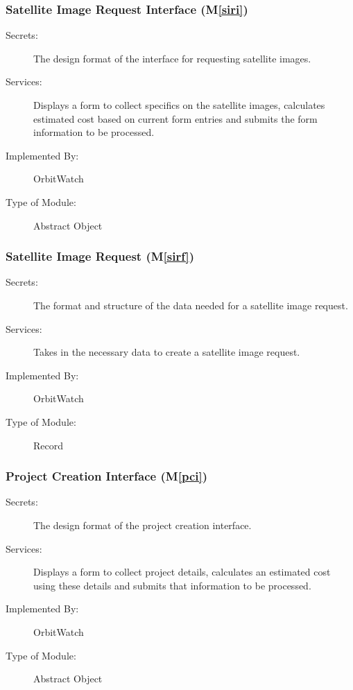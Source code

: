 \documentclass[12pt, titlepage]{article}
\newcommand{\mref}[1]{M\ref{#1}}
\begin{document}
\subsubsection{Satellite Image Request Interface (\mref{siri})}

\begin{description}
\item[Secrets:]The design format of the interface for requesting satellite images.
\item[Services:] Displays a form to collect specifics on the satellite images, calculates estimated cost based on current form entries and submits the form information to be processed.
\item[Implemented By:] OrbitWatch
\item[Type of Module:] Abstract Object
\end{description}

\subsubsection{Satellite Image Request (\mref{sirf})}

\begin{description}
\item[Secrets:]The format and structure of the data needed for a satellite image request.
\item[Services:] Takes in the necessary data to create a satellite image request.
\item[Implemented By:] OrbitWatch
\item[Type of Module:] Record
\end{description}

\subsubsection{Project Creation Interface (\mref{pci})}

\begin{description}
\item[Secrets:]The design format of the project creation interface.
\item[Services:] Displays a form to collect project details, calculates an estimated cost using these details and submits that information to be processed.
\item[Implemented By:] OrbitWatch
\item[Type of Module:] Abstract Object
\end{description}
\end{document}
